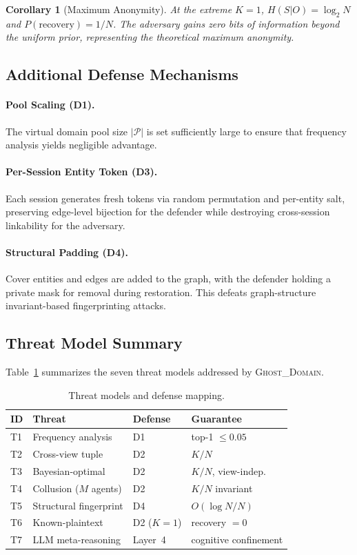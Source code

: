 \documentclass[11pt]{article}
\newtheorem{corollary}[theorem]{Corollary}
\begin{document}
\begin{corollary}[Maximum Anonymity]
At the extreme $K=1$, $H(S|O) = \log_2 N$ and $P(\text{recovery}) = 1/N$. The adversary gains zero bits of information beyond the uniform prior, representing the theoretical maximum anonymity.
\end{corollary}

\subsection{Additional Defense Mechanisms}

\paragraph{Pool Scaling (D1).} The virtual domain pool size $|\mathcal{P}|$ is set sufficiently large to ensure that frequency analysis yields negligible advantage.

\paragraph{Per-Session Entity Token (D3).} Each session generates fresh tokens via random permutation and per-entity salt, preserving edge-level bijection for the defender while destroying cross-session linkability for the adversary.

\paragraph{Structural Padding (D4).} Cover entities and edges are added to the graph, with the defender holding a private mask for removal during restoration. This defeats graph-structure invariant-based fingerprinting attacks.

\subsection{Threat Model Summary}
\label{sec:threats}

Table~\ref{tab:threats} summarizes the seven threat models addressed by \textsc{Ghost\_Domain}.

\begin{table}[t]
\centering
\caption{Threat models and defense mapping.}
\label{tab:threats}
\begin{tabular}{@{}llll@{}}
\toprule
ID & Threat & Defense & Guarantee \\
\midrule
T1 & Frequency analysis & D1 & top-1 $\leq 0.05$ \\
T2 & Cross-view tuple & D2 & $K/N$ \\
T3 & Bayesian-optimal & D2 & $K/N$, view-indep. \\
T4 & Collusion ($M$ agents) & D2 & $K/N$ invariant \\
T5 & Structural fingerprint & D4 & $O(\log N / N)$ \\
T6 & Known-plaintext & D2 ($K=1$) & recovery $= 0$ \\
T7 & LLM meta-reasoning & Layer~4 & cognitive confinement \\
\bottomrule
\end{tabular}
\end{table}
\end{document}
